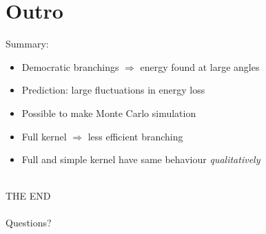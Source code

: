 \documentclass[pstricks,mathserif]{beamer}
\begin{document}
\section{Outro}
\begin{frame}


Summary:

\begin{itemize}
\item Democratic branchings $\Rightarrow$ energy found at large angles
\item Prediction: large fluctuations in energy loss
\item Possible to make Monte Carlo simulation
\item Full kernel $\Rightarrow$ less efficient branching
\item Full and simple kernel have same behaviour {\em qualitatively}
\end{itemize}
~\\
\center THE END\\
~\\
Questions?

\end{frame}
\end{document}
